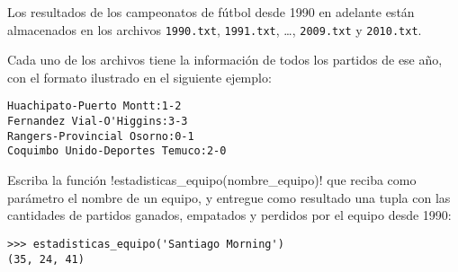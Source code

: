 Los resultados de los campeonatos de fútbol desde 1990 en adelante
están almacenados en los archivos \texttt{1990.txt}, \texttt{1991.txt},
\ldots, \texttt{2009.txt} y \texttt{2010.txt}.

Cada uno de los archivos
tiene la información de todos los partidos de ese año,
con el formato ilustrado
en el siguiente ejemplo:

\begin{minipage}{.5\textwidth}
  \begin{lstlisting}[language=file]
Huachipato-Puerto Montt:1-2
Fernandez Vial-O'Higgins:3-3
Rangers-Provincial Osorno:0-1
Coquimbo Unido-Deportes Temuco:2-0
  \end{lstlisting}
\end{minipage}

Escriba la función \li!estadisticas_equipo(nombre_equipo)!
que reciba como parámetro el nombre de un equipo,
y entregue como resultado
una tupla con las cantidades de
partidos ganados, empatados y perdidos
por el equipo desde 1990:
\begin{lstlisting}
>>> estadisticas_equipo('Santiago Morning')
(35, 24, 41)
\end{lstlisting}

